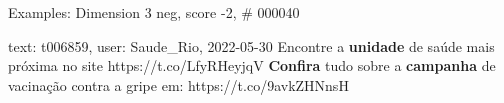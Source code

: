 \begin{frame}{Examples: Dimension 3 neg, score -2, \# 000040}
\footnotesize
\begin{alertblock}{text: t006859, user: Saude\_Rio, 2022-05-30}
 Encontre a \textbf{unidade} de saúde mais próxima no site 
https://t.co/LfyRHeyjqV  \textbf{Confira} tudo sobre a 
\textbf{campanha} de vacinação contra a gripe em: https://t.co/9avkZHNnsH 
\end{alertblock}
\end{frame}
